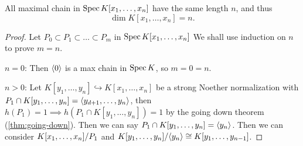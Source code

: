 \begin{theorem}
  All maximal chain in $\operatorname{Spec} K[x_1, \dots, x_n]$ have the same length $n$, and thus
  \[ \dim K[x_1, \dots, x_n] = n. \]

  \begin{proof}
    Let $P_0 \subset P_1 \subset \dots \subset P_m$ in $\operatorname{Spec} K[x_1, \dots, x_n]$
    We shall use induction on $n$ to prove $m = n$.

    $n = 0$: Then $\langle0\rangle$ is a max chain in $\operatorname{Spec} K$, so $m = 0 = n$.

    $n > 0$: Let $K[y_1, \dots, y_n] \hookrightarrow K[x_1, \dots, x_n]$
    be a strong Noether normalization with $P_1 \cap K[y_1, \dots, y_n] = \langle y_{d+1}, \dots, y_n\rangle$,
    then $h(P_1) = 1 \implies h(P_1 \cap K[y_1, \dots, y_n]) = 1$ by
    the going down theorem (\ref{thm:going-down}).
    Then we can say $P_1 \cap K[y_1, \dots, y_n] = \langle y_n\rangle$.
    Then we can consider ${K[x_1, \dots, x_n]}/{P_1}$ and
    ${K[y_1, \dots, y_n]}/{\langle y_n\rangle} \cong K[y_1, \dots, y_{n-1}]$.
  \end{proof}
\end{theorem}
